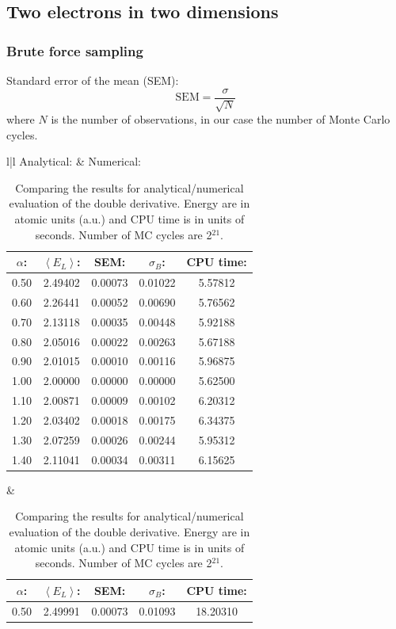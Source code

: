 \subsection{Two electrons in two dimensions}

\subsubsection{Brute force sampling}

Standard error of the mean (SEM):
\begin{equation}
\text{SEM} = \frac{\sigma}{\sqrt{N}}
\end{equation}
where $N$ is the number of observations, in our case the number of Monte Carlo cycles.

\begin{table}[H]\caption{Comparing the results for analytical/numerical evaluation of the double derivative. Energy are in atomic units (a.u.) and CPU time is in units of seconds. Number of MC cycles are 2$^{21}$.}\label{tab:brute_force_no_interaction_2p}
\center
\begin{tabular}{l|l}
Analytical: &  Numerical:\\ \hline
\begin{tabular}{ccccc}
$\alpha$: & $\left< E_L \right>$: & SEM: & $\sigma_B$: & CPU time:\\ \hline
0.50 & 2.49402 & 0.00073 & 0.01022 & 5.57812\\
0.60 & 2.26441 & 0.00052 & 0.00690 & 5.76562\\
0.70 & 2.13118 & 0.00035 & 0.00448 & 5.92188\\
0.80 & 2.05016 & 0.00022 & 0.00263 & 5.67188\\
0.90 & 2.01015 & 0.00010 & 0.00116 & 5.96875\\
1.00 & 2.00000 & 0.00000 & 0.00000 & 5.62500\\
1.10 & 2.00871 & 0.00009 & 0.00102 & 6.20312\\
1.20 & 2.03402 & 0.00018 & 0.00175 & 6.34375\\
1.30 & 2.07259 & 0.00026 & 0.00244 & 5.95312\\
1.40 & 2.11041 & 0.00034 & 0.00311 & 6.15625\\ \hline
\end{tabular} & \begin{tabular}{ccccc}
$\alpha$: & $\left< E_L \right>$: & SEM: & $\sigma_B$: & CPU time:\\ \hline
0.50 & 2.49991 & 0.00073 & 0.01093 & 18.20310\\

\end{tabular}
\end{tabular}
\end{table}
